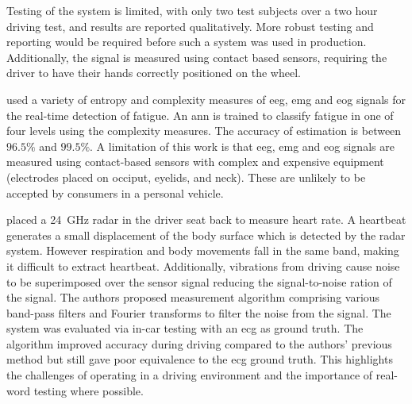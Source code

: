 \documentclass[11pt, parskip=half*,twoside=false]{scrbook}
\begin{document}
Testing of the system is limited, with only two test subjects over a two hour driving test, and results are reported qualitatively. More robust testing and reporting would be required before such a system was used in production. Additionally, the signal is measured using contact based sensors, requiring the driver to have their hands correctly positioned on the wheel. 
 
\citet{zhangAutomatedDetectionDriver2014} used a variety of entropy and complexity measures of \gls{eeg}, \gls{emg} and \gls{eog} signals for the real-time detection of fatigue. An \gls{ann} is trained to classify fatigue in one of four levels using the complexity measures. The accuracy of estimation is between $96.5\%$ and $99.5\%$. A limitation of this work is that \gls{eeg}, \gls{emg} and \gls{eog} signals are measured using contact-based sensors with complex and expensive equipment (electrodes placed on occiput, eyelids, and neck). These are unlikely to be accepted by consumers in a personal vehicle.

\citet{tsuchiyaHeartbeatDetectionTechnology2020} placed a 24~GHz radar in the driver seat back to measure heart rate. A heartbeat generates a small displacement of the body surface which is detected by the radar system. However  respiration and body movements fall in the same band, making it difficult to extract heartbeat. Additionally, vibrations from driving cause noise to be superimposed over the sensor signal reducing the signal-to-noise ration of the signal. The authors proposed measurement algorithm comprising various band-pass filters and Fourier transforms to filter the noise from the signal. The system was evaluated via in-car testing with an \gls{ecg} as ground truth. The algorithm improved accuracy during driving compared to the authors' previous method but still gave poor equivalence to the \gls{ecg} ground truth. This highlights the challenges of operating in a driving environment and the importance of real-word testing where possible. 

\end{document}
